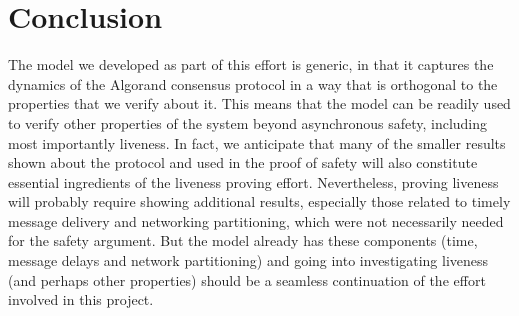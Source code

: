 \section{Conclusion}
\label{sec:conclusion}

The model we developed as part of this effort is generic, in that it captures the dynamics of the Algorand consensus protocol in a way that is orthogonal to the properties that we verify about it. This means that the model can be readily used to verify other properties of the system beyond asynchronous safety, including most importantly liveness. In fact, we anticipate that many of the smaller results shown about the protocol and used in the proof of safety will also constitute essential ingredients of the liveness proving effort. Nevertheless, proving liveness will probably require showing additional results, especially those related to timely message delivery and networking partitioning, which were not necessarily needed for the safety argument. But the model already has these components (time, message delays and network partitioning) and going into investigating liveness (and perhaps other properties) should be a seamless continuation of the effort involved in this project.
